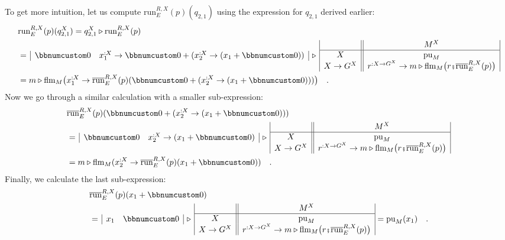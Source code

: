 To get more intuition, let us compute $\text{run}_{E}^{R,X}(p)(q_{2,1})$
using the expression for $q_{2,1}$ derived earlier:
\begin{align*}
 & \text{run}_{E}^{R,X}(p)(q_{2,1}^{X})=q_{2,1}^{X}\triangleright\text{run}_{E}^{R,X}(p)\\
 & =\,\begin{array}{|cc|}
\bbnum 0 & x_{1}^{:X}\rightarrow\bbnum 0+(x_{2}^{:X}\rightarrow(x_{1}+\bbnum 0))\end{array}\,\triangleright\,\begin{array}{|c||c|}
 & M^{X}\\
\hline X & \text{pu}_{M}\\
X\rightarrow G^{X} & r^{:X\rightarrow G^{X}}\rightarrow m\triangleright\text{flm}_{M}\big(r\bef\overline{\text{run}}_{E}^{R,X}(p)\big)
\end{array}\\
 & =m\triangleright\text{flm}_{M}\big(x_{1}^{:X}\rightarrow\overline{\text{run}}_{E}^{R,X}(p)(\bbnum 0+(x_{2}^{:X}\rightarrow(x_{1}+\bbnum 0)))\big)\quad.
\end{align*}
Now we go through a similar calculation with a smaller sub-expression:
\begin{align*}
 & \overline{\text{run}}_{E}^{R,X}(p)(\bbnum 0+(x_{2}^{:X}\rightarrow(x_{1}+\bbnum 0)))\\
 & =\,\begin{array}{|cc|}
\bbnum 0 & x_{2}^{:X}\rightarrow(x_{1}+\bbnum 0)\end{array}\,\triangleright\,\begin{array}{|c||c|}
 & M^{X}\\
\hline X & \text{pu}_{M}\\
X\rightarrow G^{X} & r^{:X\rightarrow G^{X}}\rightarrow m\triangleright\text{flm}_{M}\big(r\bef\overline{\text{run}}_{E}^{R,X}(p)\big)
\end{array}\\
 & =m\triangleright\text{flm}_{M}(x_{2}^{:X}\rightarrow\overline{\text{run}}_{E}^{R,X}(p)(x_{1}+\bbnum 0))\quad.
\end{align*}
Finally, we calculate the last sub-expression:
\begin{align*}
 & \overline{\text{run}}_{E}^{R,X}(p)(x_{1}+\bbnum 0)\\
 & =\,\begin{array}{|cc|}
x_{1} & \bbnum 0\end{array}\,\triangleright\,\begin{array}{|c||c|}
 & M^{X}\\
\hline X & \text{pu}_{M}\\
X\rightarrow G^{X} & r^{:X\rightarrow G^{X}}\rightarrow m\triangleright\text{flm}_{M}\big(r\bef\overline{\text{run}}_{E}^{R,X}(p)\big)
\end{array}=\text{pu}_{M}(x_{1})\quad.
\end{align*}
